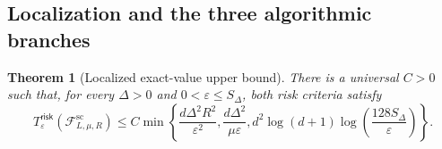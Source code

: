 \documentclass[11pt]{article}
\newcommand{\cF}{\mathcal{F}}
\newcommand{\eps}{\varepsilon}
\theoremstyle{plain}
\newtheorem{theorem}{Theorem}[section]
\theoremstyle{definition}
\begin{document}
\subsection{Localization and the three algorithmic branches}

\begin{theorem}[Localized exact-value upper bound]\label{thm:upper}
There is a universal $C>0$ such that, for every $\Delta>0$ and
$0<\eps\le S_\Delta$, both risk criteria satisfy
\begin{equation}\label{eq:upper-envelope}
 T^{\mathsf{risk}}_\eps(\cF^{\mathrm{sc}}_{L,\mu,R})
 \le C\min\left\{
       \frac{d\Delta^2R^2}{\eps^2},
       \frac{d\Delta^2}{\mu\eps},
       d^2\log(d+1)\log\!\left(\frac{128S_\Delta}{\eps}\right)
       \right\}.
\end{equation}
\end{theorem}
\end{document}
